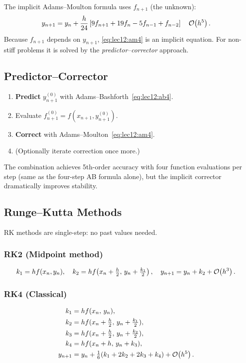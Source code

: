 The implicit Adams–Moulton formula uses $f_{n+1}$ (the unknown):
\begin{equation}
  y_{n+1} = y_n + \frac{h}{24}\left[9f_{n+1} + 19f_n
             - 5f_{n-1} + f_{n-2}\right]
  \quad \mathcal{O}\!\left(h^5\right).
  \label{eq:lec12:am4}
\end{equation}
Because $f_{n+1}$ depends on $y_{n+1}$, \eqref{eq:lec12:am4} is an
implicit equation.  For non-stiff problems it is solved by the
\emph{predictor–corrector} approach.

\subsection{Predictor--Corrector}\label{subsec:lec12:pc}

\begin{enumerate}
  \item \textbf{Predict} $y_{n+1}^{(0)}$ with Adams–Bashforth~\eqref{eq:lec12:ab4}.
  \item Evaluate $f_{n+1}^{(0)} = f(x_{n+1}, y_{n+1}^{(0)})$.
  \item \textbf{Correct} with Adams–Moulton~\eqref{eq:lec12:am4}.
  \item (Optionally iterate correction once more.)
\end{enumerate}

The combination achieves 5th-order accuracy with four function
evaluations per step (same as the four-step AB formula alone), but
the implicit corrector dramatically improves stability.

\subsection{Runge--Kutta Methods}\label{subsec:lec12:rk}

RK methods are single-step: no past values needed.

\subsubsection*{RK2 (Midpoint method)}
\begin{equation}
  k_1 = hf(x_n, y_n),\quad
  k_2 = hf\!\left(x_n+\tfrac{h}{2},\,y_n+\tfrac{k_1}{2}\right),\quad
  y_{n+1} = y_n + k_2 + \mathcal{O}\!\left(h^3\right).
  \label{eq:lec12:rk2}
\end{equation}

\subsubsection*{RK4 (Classical)}
\begin{align}
  k_1 &= hf(x_n,\,y_n),\notag\\
  k_2 &= hf(x_n+\tfrac{h}{2},\,y_n+\tfrac{k_1}{2}),\notag\\
  k_3 &= hf(x_n+\tfrac{h}{2},\,y_n+\tfrac{k_2}{2}),\notag\\
  k_4 &= hf(x_n+h,\,y_n+k_3),\notag\\
  y_{n+1} &= y_n + \tfrac{1}{6}(k_1+2k_2+2k_3+k_4) + \mathcal{O}\!\left(h^5\right).
  \label{eq:lec12:rk4}
\end{align}

